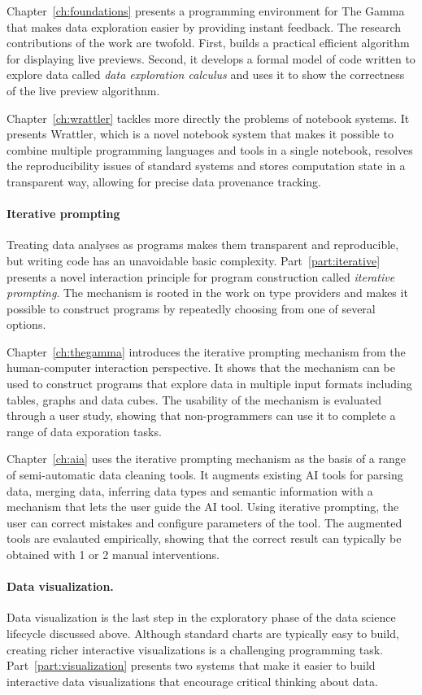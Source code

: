 \documentclass[fleqn,11pt]{report}
\theoremstyle{definition}
\begin{document}
Chapter~\ref{ch:foundations} presents a programming environment for The Gamma that makes data
exploration easier by providing instant feedback. The research contributions of the work are
twofold. First, builds a practical efficient algorithm for displaying live previews. Second, it
develops a formal model of code written to explore data called \emph{data exploration calculus}
and uses it to show the correctness of the live preview algorithnm.

Chapter~\ref{ch:wrattler} tackles more directly the problems of notebook systems. It presents
Wrattler, which is a novel notebook system that makes it possible to combine multiple
programming languages and tools in a single notebook, resolves the reproducibility issues of
standard systems and stores computation state in a transparent way, allowing for precise
data provenance tracking.

\paragraph{Iterative prompting}
Treating data analyses as programs makes them transparent and reproducible, but writing code has
an unavoidable basic complexity. Part~\ref{part:iterative} presents a novel interaction principle for
program construction called \emph{iterative prompting}. The mechanism is rooted in the work on type
providers and makes it possible to construct programs by repeatedly choosing from one of several
options.

Chapter~\ref{ch:thegamma} introduces the iterative prompting mechanism from the human-computer
interaction perspective. It shows that the mechanism can be used to construct programs that
explore data in multiple input formats including tables, graphs and data cubes. The usability of
the mechanism is evaluated through a user study, showing that non-programmers can use it to
complete a range of data exporation tasks.

Chapter~\ref{ch:aia} uses the iterative prompting mechanism as the basis of a range of
semi-automatic data cleaning tools. It augments existing AI tools for parsing data, merging data,
inferring data types and semantic information with a mechanism that lets the user guide the AI
tool. Using iterative prompting, the user can correct mistakes and configure parameters of the tool.
The augmented tools are evalauted empirically, showing that the correct result can typically be
obtained with 1 or 2 manual interventions.

\paragraph{Data visualization.}
Data visualization is the last step in the exploratory phase of the data science lifecycle
discussed above. Although standard charts are typically easy to build, creating richer
interactive visualizations is a challenging programming task. Part~\ref{part:visualization}
presents two systems that make it easier to build interactive data visualizations that encourage
critical thinking about data.
\end{document}
